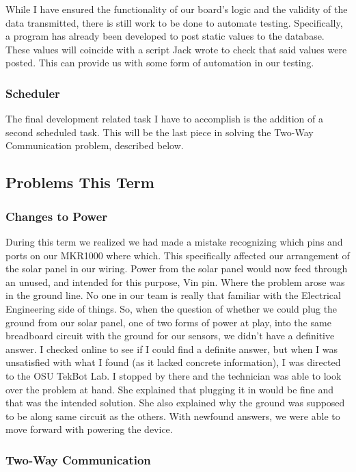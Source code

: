 \documentclass[IEEEtran,letterpaper,10pt,titlepage,fleqn,draftclsnofoot,onecolumn]{article}
\begin{document}
While I have ensured the functionality of our board’s logic and the validity of the data transmitted, there is still work to be done to automate testing. Specifically, a program has already been developed to post static values to the database. These values will coincide with a script Jack wrote to check that said values were posted. This can provide us with some form of automation in our testing.

\subsubsection{Scheduler}

The final development related task I have to accomplish is the addition of a second scheduled task. This will be the last piece in solving the Two-Way Communication problem, described below. 

\subsection{Problems This Term}

\subsubsection{Changes to Power}

During this term we realized we had made a mistake recognizing which pins and ports on our MKR1000 where which. This specifically affected our arrangement of the solar panel in our wiring. Power from the solar panel would now feed through an unused, and intended for this purpose, Vin pin. Where the problem arose was in the ground line. No one in our team is really that familiar with the Electrical Engineering side of things. So, when the question of whether we could plug the ground from our solar panel, one of two forms of power at play, into the same breadboard circuit with the ground for our sensors, we didn’t have a definitive answer. I checked online to see if I could find a definite answer, but when I was unsatisfied with what I found (as it lacked concrete information), I was directed to the OSU TekBot Lab. I stopped by there and the technician was able to look over the problem at hand. She explained that plugging it in would be fine and that was the intended solution. She also explained why the ground was supposed to be along same circuit as the others. With newfound answers, we were able to move forward with powering the device.

\subsubsection{Two-Way Communication}
\end{document}
